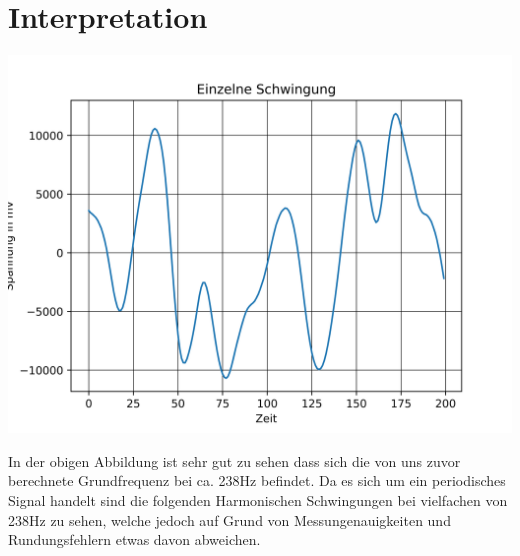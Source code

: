 \section{Interpretation}
\label{chap:VERSUCH_1_INTERPRETATION}


\includegraphics[scale=0.8]{media/singleperiod.png}
\label{fig: Einzelne Schwingung}

In der obigen Abbildung ist sehr gut zu sehen dass sich die von uns zuvor berechnete Grundfrequenz
bei ca. 238Hz befindet. Da es sich um ein periodisches Signal handelt sind die folgenden Harmonischen Schwingungen bei vielfachen von 238Hz zu sehen, welche jedoch auf Grund von Messungenauigkeiten und Rundungsfehlern etwas davon abweichen.